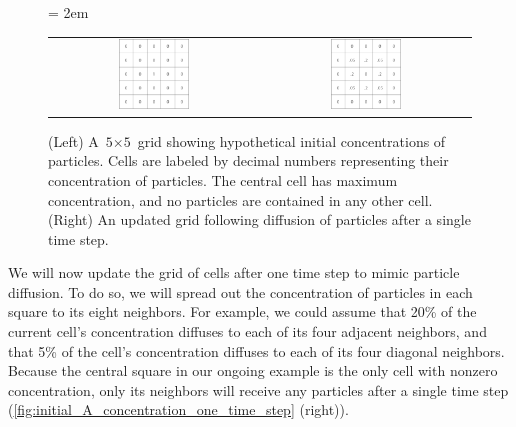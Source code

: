 \begin{figure}[h]
\centering
\mySfFamily
\tabcolsep = 2em
\begin{tabular}{c c}
\includegraphics[width = 0.35\textwidth]{../images/initial_A_concentration} & \includegraphics[width = 0.35\textwidth]{../images/A_concentration_one_time_step}
\end{tabular}
\caption{(Left) A $\text{5} \times \text{5}$ grid showing hypothetical initial concentrations of  particles. Cells are labeled by decimal numbers representing their concentration of  particles. The central cell has maximum concentration, and no particles are contained in any other cell. (Right) An updated grid following diffusion of particles after a single time step.}
\label{fig:initial_A_concentration_one_time_step}
\end{figure}

We will now update the grid of cells after one time step to mimic particle diffusion. To do so, we will spread out the concentration of particles in each square to its eight neighbors. For example, we could assume that 20\% of the current cell's concentration diffuses to each of its four adjacent neighbors, and that 5\% of the cell's concentration diffuses to each of its four diagonal neighbors. Because the central square in our ongoing example is the only cell with nonzero concentration, only its neighbors will receive any particles after a single time step (\autoref{fig:initial_A_concentration_one_time_step} (right)).\\

\begin{note}\end{note}

